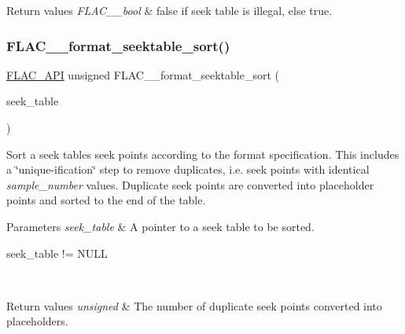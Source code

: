 \begin{DoxyRetVals}{Return values}
{\em F\+L\+A\+C\+\_\+\+\_\+bool} & {\ttfamily false} if seek table is illegal, else {\ttfamily true}. \\
\hline
\end{DoxyRetVals}
\mbox{\label{group__flac__format_gad1b0090d45a6d65a696a81261bd7fbf6}} 
\subsubsection{\texorpdfstring{F\+L\+A\+C\+\_\+\+\_\+format\+\_\+seektable\+\_\+sort()}{FLAC\_\_format\_seektable\_sort()}}
{\footnotesize\ttfamily \hyperlink{group__flac__export_ga56ca07df8a23310707732b1c0007d6f5}{F\+L\+A\+C\+\_\+\+A\+PI} unsigned F\+L\+A\+C\+\_\+\+\_\+format\+\_\+seektable\+\_\+sort (\begin{DoxyParamCaption}\item[{\hyperlink{struct_f_l_a_c_____stream_metadata___seek_table}{F\+L\+A\+C\+\_\+\+\_\+\+Stream\+Metadata\+\_\+\+Seek\+Table} $\ast$}]{seek\+\_\+table }\end{DoxyParamCaption})}

Sort a seek table\textquotesingle{}s seek points according to the format specification. This includes a \char`\"{}unique-\/ification\char`\"{} step to remove duplicates, i.\+e. seek points with identical {\itshape sample\+\_\+number} values. Duplicate seek points are converted into placeholder points and sorted to the end of the table.


\begin{DoxyParams}{Parameters}
{\em seek\+\_\+table} & A pointer to a seek table to be sorted.  
\begin{DoxyCode}
seek\_table != NULL 
\end{DoxyCode}
 \\
\hline
\end{DoxyParams}

\begin{DoxyRetVals}{Return values}
{\em unsigned} & The number of duplicate seek points converted into placeholders. \\
\hline
\end{DoxyRetVals}
\mbox{\label{group__flac__format_ga6878e238052fc0f7109b55129d64b4e5}} 
